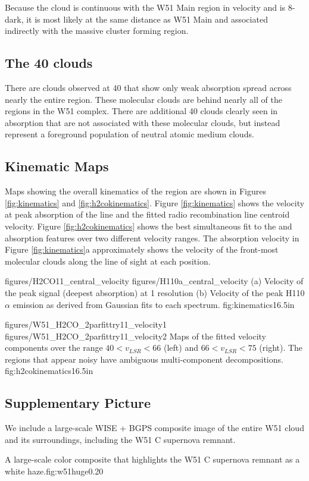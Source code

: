 Because the cloud is continuous with the W51 Main region in velocity and is
8\um-dark, it is most likely at the same distance as W51 Main and
associated indirectly with the massive cluster forming region.

\subsection{The 40 \kms clouds}
There are clouds observed at 40 \kms that show only weak \formaldehyde
absorption spread across nearly the entire region.  These molecular clouds are
behind nearly all of the \hii regions in the W51 complex.  There are additional
40 \kms clouds clearly seen in \hi absorption \citep{Stil2006a} that are not
associated with these molecular clouds, but instead represent a foreground
population of neutral atomic medium clouds.

\subsection{Kinematic Maps}
\label{sec:kinematics}
Maps showing the overall kinematics of the region are shown in Figures
\ref{fig:kinematics} and \ref{fig:h2cokinematics}.  Figure \ref{fig:kinematics}
shows the velocity at peak absorption of the \formaldehyde \oneone line and the
fitted radio recombination line centroid velocity.  Figure
\ref{fig:h2cokinematics} shows the best simultaneous fit to the \formaldehyde
\oneone and \twotwo absorption features over two different velocity ranges.
The \oneone absorption velocity in Figure \ref{fig:kinematics}a approximately
shows the velocity of the front-most molecular clouds along the line of sight
at each position.

\FigureTwoAA
{figures/H2CO11_central_velocity}
{figures/H110a_central_velocity}
{(a) Velocity of the peak \formaldehyde \oneone signal (deepest absorption) at
1 \kms resolution
(b) Velocity of the peak H110$\alpha$ emission as derived from Gaussian fits
to each spectrum.}
{fig:kinematics}{1}{6.5in}

\FigureTwoAA
{figures/W51_H2CO_2parfittry11_velocity1}
{figures/W51_H2CO_2parfittry11_velocity2}
{Maps of the fitted \formaldehyde velocity components over the range $40 <
v_{LSR} < 66$ \kms (left) and $66 < v_{LSR} < 75$ \kms (right).  The regions
that appear noisy have ambiguous multi-component decompositions.  }
{fig:h2cokinematics}{1}{6.5in}

\subsection{Supplementary Picture}
We include a large-scale WISE + BGPS composite image of the entire W51 cloud and its
surroundings, including the W51 C supernova remnant.

{A large-scale color composite that highlights the W51 C supernova remnant as a
white haze.}{fig:w51huge}{0.2}{0}




